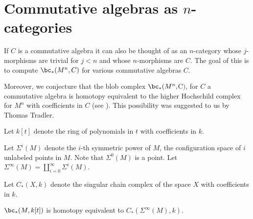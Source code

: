 
\section{Commutative algebras as $n$-categories}
\label{sec:comm_alg}



If $C$ is a commutative algebra it
can also be thought of as an $n$-category whose $j$-morphisms are trivial for
$j<n$ and whose $n$-morphisms are $C$. 
The goal of this  is to compute
$\bc_*(M^n, C)$ for various commutative algebras $C$.

Moreover, we conjecture that the blob complex $\bc_*(M^n, $C$)$, for $C$ a commutative 
algebra is homotopy equivalent to the higher Hochschild complex for $M^n$ with 
coefficients in $C$ (see \cite{MR0339132, MR1755114, MR2383113}).  
This possibility was suggested to us by Thomas Tradler.


\medskip

Let $k[t]$ denote the ring of polynomials in $t$ with coefficients in $k$.

Let $\Sigma^i(M)$ denote the $i$-th symmetric power of $M$, the configuration space of $i$
unlabeled points in $M$.
Note that $\Sigma^0(M)$ is a point.
Let $\Sigma^\infty(M) = \coprod_{i=0}^\infty \Sigma^i(M)$.

Let $C_*(X, k)$ denote the singular chain complex of the space $X$ with coefficients in $k$.

\begin{prop} \label{sympowerprop}
$\bc_*(M, k[t])$ is homotopy equivalent to $C_*(\Sigma^\infty(M), k)$.
\end{prop}

